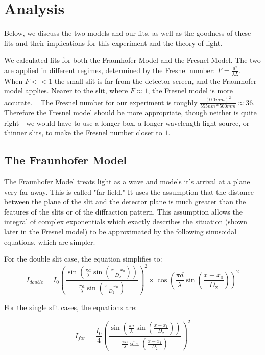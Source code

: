 \documentclass[prb,preprint]{revtex4-1}
\begin{document}
\section{Analysis}

Below, we discuss the two models and our fits, as well as the goodness of these fits and their implications for this experiment and the theory of light.

We calculated fits for both the Fraunhofer Model and the Fresnel Model.  The two are applied in different regimes, determined by the Fresnel number: $F = \frac{a^2}{\lambda L}$.  When $F << 1$ the small slit is far from the detector screen, and the Fraunhofer model applies.  Nearer to the slit, where $F \approx 1$, the Fresnel model is more accurate. ~\cite{wolfram} The Fresnel number for our experiment is roughly $\frac{(0.1mm)^2}{555nm*500mm} \approx 36$.  Therefore the Fresnel model should be more appropriate, though neither is quite right - we would have to use a longer box, a longer wavelength light source, or thinner slits, to make the Fresnel number closer to $1$. 

\subsection{The Fraunhofer Model}

The Fraunhofer Model treats light as a wave and models it's arrival at a plane very far away. This is called "far field." It uses the assumption that the distance between the plane of the slit and the detector plane is much greater than the features of the slits or of the diffraction pattern.  This assumption allows the integral of complex exponentials which exactly describes the situation (shown later in the Fresnel model) to be approximated by the following sinusoidal equations, which are simpler. ~\cite{wolfram}

For the double slit case, the equation simplifies to:
\begin{equation}
I_{double}= I_{0}(\frac{\sin(\frac{\pi a}{\lambda}\sin(\frac{x-x_{0}}{D_{2}}))}{\frac{\pi a}{\lambda}\sin(\frac{x-x_{0}}{D_{2}})})^{2} \times \cos(\frac{\pi d}{\lambda}\sin(\frac{x-x_{0}}{D_{2}}))^{2}
\end{equation}

For the single slit cases, the equations are: 

\begin{equation}
I_{far}= \frac{I_{0}}{4}(\frac{\sin(\frac{\pi a}{\lambda}\sin(\frac{x-x_{1}}{D_{2}}))}{\frac{\pi a}{\lambda}\sin(\frac{x-x_{1}}{D_{2}})})^{2} 
\end{equation}
\end{document}
